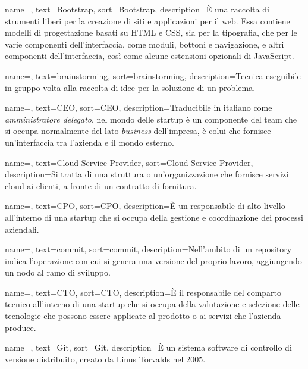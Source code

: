 {
    name=,
    text=Bootstrap,
    sort=Bootstrap,
    description={È una raccolta di strumenti liberi per la creazione di siti e applicazioni per il web. Essa contiene modelli di progettazione basati su HTML e CSS, sia per la tipografia, che per le varie componenti dell'interfaccia, come moduli, bottoni e navigazione, e altri componenti dell'interfaccia, così come alcune estensioni opzionali di JavaScript.}
}

{
    name=,
    text=brainstorming,
    sort=brainstorming,
    description={Tecnica eseguibile in gruppo volta alla raccolta di idee per la soluzione di un problema.}
}

{
    name=,
    text=CEO,
    sort=CEO,
    description={Traducibile in italiano come \textit{amministratore delegato}, nel mondo delle startup è un componente del team che si occupa normalmente del lato \textit{business} dell'impresa, è colui che fornisce un'interfaccia tra l'azienda e il mondo esterno.}
}

{
    name=,
    text=Cloud Service Provider,
    sort=Cloud Service Provider,
    description={Si tratta di una struttura o un'organizzazione che fornisce servizi cloud ai clienti, a fronte di un contratto di fornitura.}
}

{
    name=,
    text=CPO,
    sort=CPO,
    description={È un responsabile di alto livello all'interno di una startup che si occupa della gestione e coordinazione dei processi aziendali.}
}

{
    name=,
    text=commit,
    sort=commit,
    description={Nell'ambito di un repository indica l'operazione con cui si genera una versione del proprio lavoro, aggiungendo un nodo al ramo di sviluppo.}
}

{
    name=,
    text=CTO,
    sort=CTO,
    description={È il responsabile del comparto tecnico all'interno di una startup che si occupa della valutazione e selezione delle tecnologie che possono essere applicate al prodotto o ai servizi che l'azienda produce.}
}

{
    name=,
    text=Git,
    sort=Git,
    description={È un sistema software di controllo di versione distribuito, creato da Linus Torvalds nel 2005.}
}

